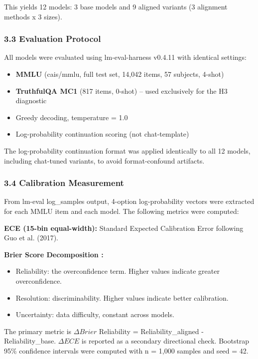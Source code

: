 This yields 12 models: 3 base models and 9 aligned variants (3 alignment methods x 3 sizes).

\subsubsection{3.3 Evaluation Protocol}

All models were evaluated using lm-eval-harness v0.4.11 with identical settings:
\begin{itemize}
\item \textbf{MMLU} (cais/mmlu, full test set, 14,042 items, 57 subjects, 4-shot)
\item \textbf{TruthfulQA MC1} (817 items, 0-shot) -- used exclusively for the H3 diagnostic
\item Greedy decoding, temperature = 1.0
\item Log-probability continuation scoring (not chat-template)
\end{itemize}

The log-probability continuation format was applied identically to all 12 models, including chat-tuned variants, to avoid format-confound artifacts.

\subsubsection{3.4 Calibration Measurement}

From lm-eval log\_samples output, 4-option log-probability vectors were extracted for each MMLU item and each model. The following metrics were computed:

\textbf{ECE (15-bin equal-width):} Standard Expected Calibration Error following Guo et al. (2017).

\textbf{Brier Score Decomposition \citep{murphy1973scalar}:}
\begin{itemize}
\item Reliability: the overconfidence term. Higher values indicate greater overconfidence.
\item Resolution: discriminability. Higher values indicate better calibration.
\item Uncertainty: data difficulty, constant across models.
\end{itemize}

The primary metric is $\Delta Brier$ Reliability = Reliability\_aligned - Reliability\_base. $\Delta ECE$ is reported as a secondary directional check. Bootstrap 95\% confidence intervals were computed with n = 1,000 samples and seed = 42.

